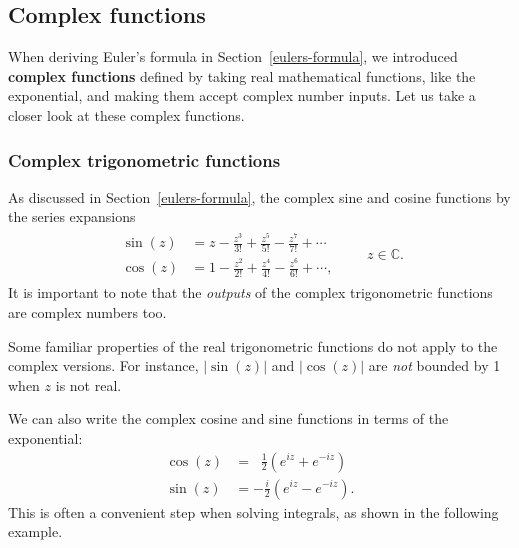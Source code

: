 \documentclass[10pt,a4paper]{article}
\begin{document}
\subsection{Complex functions}
\label{complex-functions}

When deriving Euler's formula in Section~\ref{eulers-formula}, we
introduced \textbf{complex functions} defined by taking real
mathematical functions, like the exponential, and making them accept
complex number inputs.  Let us take a closer look at these complex
functions.

\subsubsection{Complex trigonometric functions}
\label{complex-trigonometric-functions}

As discussed in Section~\ref{eulers-formula}, the complex sine and
cosine functions by the series expansions
\begin{align}
  \begin{aligned}
    \sin(z) &= z - \frac{z^3}{3!} + \frac{z^5}{5!} - \frac{z^7}{7!} + \cdots\\
    \cos(z) &= 1 - \frac{z^2}{2!} + \frac{z^4}{4!} - \frac{z^6}{6!} + \cdots,
  \end{aligned}
  \quad\quad z\in \mathbb{C}.
\end{align}
It is important to note that the \textit{outputs} of the complex
trigonometric functions are complex numbers too.

Some familiar properties of the real trigonometric functions do not
apply to the complex versions.  For instance, $|\sin(z)|$ and
$|\cos(z)|$ are \textit{not} bounded by 1 when $z$ is not real.

We can also write the complex cosine and sine functions in terms of
the exponential:
\begin{align}
  \cos(z) &= \;\;\frac{1}{2}\left(e^{iz} + e^{-iz}\right)
  \label{eq:cosz}\\
  \sin(z) &= -\frac{i}{2}\left(e^{iz} - e^{-iz}\right).
  \label{eq:sinz}
\end{align}
This is often a convenient step when solving integrals, as shown in
the following example.
\end{document}
